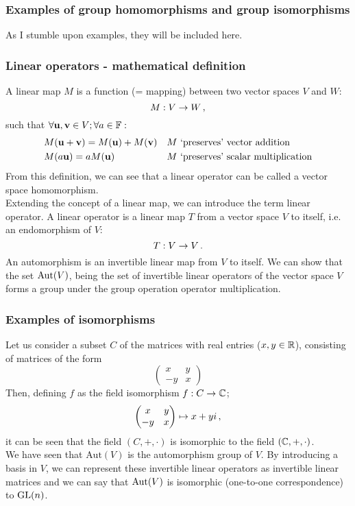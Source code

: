    \subsubsection{Examples of group homomorphisms and group isomorphisms}
        As I stumble upon examples, they will be included here.

    \subsubsection{Linear operators - mathematical definition}
        A linear map $M$ is a function (= mapping) between two vector spaces $V$ and $W$:
        \begin{equation}
            M: V \rightarrow W \thinspace ,
        \end{equation}
        such that $\forall \vb{u}, \vb{v} \in V; \forall a \in \mathbb{F}:$
        \begin{align}
            &M(\vb{u} + \vb{v}) = M(\vb{u}) + M(\vb{v})     && \text{$M$ `preserves' vector addition} \\
            &M(a \vb{u}) = a M(\vb{u})                      && \text{$M$ `preserves' scalar multiplication}
        \end{align}
        From this definition, we can see that a linear operator can be called a vector space homomorphism. \\

        Extending the concept of a linear map, we can introduce the term linear operator. A linear operator is a linear map $T$ from a vector space $V$ to itself, i.e. an endomorphism of $V$:
        \begin{equation}
            T: V \rightarrow V \thinspace .
        \end{equation}
        An automorphism is an invertible linear map from $V$ to itself. We can show that the set $\operatorname{Aut}(V)$, being the set of invertible linear operators of the vector space $V$ forms a group under the group operation operator multiplication.

    \subsubsection{Examples of isomorphisms}
        Let us consider a subset $C$ of the matrices with real entries ($x, y \in \mathbb{R}$), consisting of matrices of the form
        \begin{equation}
            \begin{pmatrix} x & y \\ -y & x \end{pmatrix}
        \end{equation}
        Then, defining $f$ as the field isomorphism $f: C \rightarrow \mathbb{C}$;
        \begin{equation}
            \begin{pmatrix} x & y \\ -y & x \end{pmatrix} \mapsto x + yi \thinspace ,
        \end{equation}
        it can be seen that the field $(C, +, \cdot)$ is isomorphic to the field $(\mathbb{C}, +, \cdot)$. \\

        We have seen that $\text{Aut}(V)$ is the automorphism group of $V$. By introducing a basis in $V$, we can represent these invertible linear operators as invertible linear matrices and we can say that $\operatorname{Aut}(V)$ is isomorphic (one-to-one correspondence) to $\operatorname{GL}(n)$. \\
